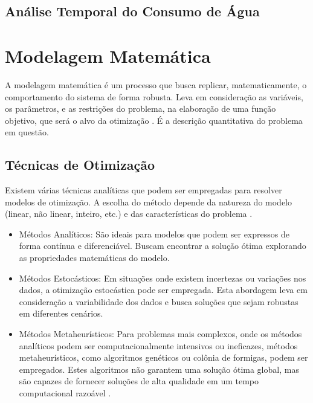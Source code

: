 \subsection*{Análise Temporal do Consumo de Água}\label{sec:2.1}


\section{Modelagem Matemática}

A modelagem matemática é um processo que busca replicar, matematicamente, o comportamento do sistema de forma robusta. Leva em consideração as variáveis, os parâmetros, e as restrições do problema, na elaboração de uma função objetivo, que será o alvo da otimização \cite{Mark}. É a descrição quantitativa do problema em questão.


\subsection*{Técnicas de Otimização}

Existem várias técnicas analíticas que podem ser empregadas para resolver modelos de otimização. A escolha do método depende da natureza do modelo (linear, não linear, inteiro, etc.) e das características do problema \cite{Chambers1976}.

\begin{itemize}

\item[-] Métodos Analíticos: São ideais para modelos que podem ser expressos de forma contínua e diferenciável. Buscam encontrar a solução ótima explorando as propriedades matemáticas do modelo. 
\item[-] Métodos Estocásticos: Em situações onde existem incertezas ou variações nos dados, a otimização estocástica pode ser empregada. Esta abordagem leva em consideração a variabilidade dos dados e busca soluções que sejam robustas em diferentes cenários.
\item[-] Métodos Metaheurísticos: Para problemas mais complexos, onde os métodos analíticos podem ser computacionalmente intensivos ou ineficazes, métodos metaheurísticos, como algoritmos genéticos ou colônia de formigas, podem ser empregados. Estes algoritmos não garantem uma solução ótima global, mas são capazes de fornecer soluções de alta qualidade em um tempo computacional razoável \cite{GasparCunha2012}.

\end{itemize}

